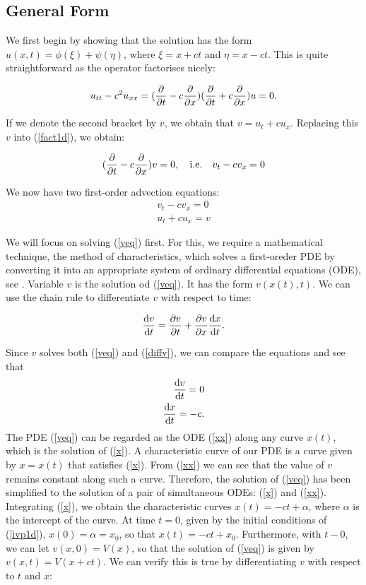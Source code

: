 \documentclass[a4paper, 12pt]{article}
\numberwithin{equation}{section}
\begin{document}
\subsection{General Form}

We first begin by showing that the solution has the form $u(x,
t)=\phi(\xi)+\psi(\eta)$, where $\xi=x+ct$ and $\eta=x-ct$. This is quite
straightforward as the operator factorises nicely:

\begin{equation} \label{fact1d}
    u_{tt}-c^2u_{xx}=(\diffp[1]{}{t} - c \diffp[1]{}{x})(\diffp[1]{}{t} + c \diffp[1]{}{x})u=0.
\end{equation}

If we denote the second bracket by $v$, we obtain that $v=u_t+cu_x$. Replacing
this $v$ into (\ref{fact1d}), we obtain:

\begin{equation*} 
    (\diffp[1]{}{t} -c \diffp[1]{}{x})v=0, \quad \textrm{i.e.} \quad v_t-cv_x=0
\end{equation*}

We now have two first-order advection equations:
\begin{align}
    v_t-cv_x=0 \label{veq}\\
    u_t+cu_x=v \label{ueq}
\end{align}

We will focus on solving (\ref{veq}) first. For this, we require a mathematical
technique, the method of characteristics, which solves a first-oreder PDE by
converting it into an appropriate system of ordinary differential equations
(ODE), see \cite[Ch. 2.1, Ch. 3.2]{Ev}. Variable $v$ is the solution od
(\ref{veq}). It has the form $v(x(t), t)$. We can use the chain rule to
differentiate $v$ with respect to time:

\begin{equation} \label{diffv}
    \diff{v}{t}=\diffp[1]{v}{t}+\diffp[1]{v}{x}\diff{x}{t}.
\end{equation}

Since $v$ solves both (\ref{veq}) and (\ref{diffv}), we can compare the
equations and see that
\begin{align}
    \diff{v}{t}=0 \label{xx}\\
    \diff{x}{t}=-c \label{x}.
\end{align}
The PDE (\ref{veq}) can be regarded as the ODE (\ref{xx}) along any curve
$x(t)$, which is the solution of (\ref{x}). A characteristic curve of our PDE is
a curve given by $x=x(t)$ that satisfies (\ref{x}). From (\ref{xx}) we can see
that the value of $v$ remains constant along such a curve. Therefore, the
solution of (\ref{veq}) has been simplified to the solution of a pair of
simultaneous ODEs: (\ref{x}) and (\ref{xx}). Integrating (\ref{x}), we obtain
the characteristic curves $x(t)=-ct+\alpha$, where $\alpha$ is the intercept of
the curve. At time $t=0$, given by the initial conditions of (\ref{ivp1d}),
$x(0)=\alpha=x_0$, so that $x(t)=-ct+x_0$. Furthermore, with $t-0$, we can let
$v(x,0)=V(x)$, so that the solution of (\ref{veq}) is given by $v(x,t)=V(x+ct)$.
We can verify this is true by differentiating $v$ with respect to $t$ and $x$:
\end{document}
